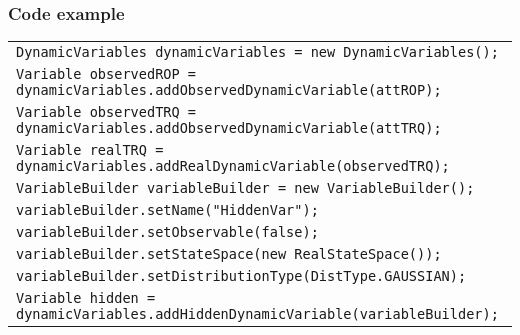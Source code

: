 \subsubsection*{Code example}

\begin{table}[H]
\begin{tabular}{l} \hline

        \texttt{DynamicVariables dynamicVariables = new DynamicVariables();}\\

        \texttt{Variable observedROP = dynamicVariables.addObservedDynamicVariable(attROP);}\\
        \texttt{Variable observedTRQ = dynamicVariables.addObservedDynamicVariable(attTRQ);}\\
        \texttt{Variable realTRQ = dynamicVariables.addRealDynamicVariable(observedTRQ);}\\

        \texttt{VariableBuilder variableBuilder = new VariableBuilder();}\\
        \texttt{variableBuilder.setName("HiddenVar");}\\
        \texttt{variableBuilder.setObservable(false);}\\
        \texttt{variableBuilder.setStateSpace(new RealStateSpace()); }\\
        \texttt{variableBuilder.setDistributionType(DistType.GAUSSIAN);}\\
        \texttt{Variable hidden = dynamicVariables.addHiddenDynamicVariable(variableBuilder);}\\ \hline 

\end{tabular}
\end{table}

        
        
        
        
        
        